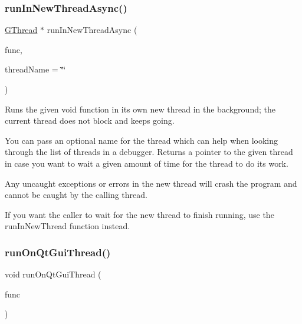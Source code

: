 \subsubsection{\texorpdfstring{run\+In\+New\+Thread\+Async()}{runInNewThreadAsync()}}
{\footnotesize\ttfamily \mbox{\hyperlink{classsgl_1_1GThread}{G\+Thread}} $\ast$ run\+In\+New\+Thread\+Async (\begin{DoxyParamCaption}\item[{\mbox{\hyperlink{namespacesgl_aa508400d1219d217e0e9509ff59a58f4}{G\+Thunk}}}]{func,  }\item[{const std\+::string \&}]{thread\+Name = {\ttfamily \char`\"{}\char`\"{}} }\end{DoxyParamCaption})\hspace{0.3cm}{\ttfamily [static]}}



Runs the given void function in its own new thread in the background; the current thread does not block and keeps going. 

You can pass an optional name for the thread which can help when looking through the list of threads in a debugger. Returns a pointer to the given thread in case you want to wait a given amount of time for the thread to do its work.

Any uncaught exceptions or errors in the new thread will crash the program and cannot be caught by the calling thread.

If you want the caller to wait for the new thread to finish running, use the {\ttfamily run\+In\+New\+Thread} function instead. \mbox{\label{classsgl_1_1GThread_a33da0c87717269710ac7a564a1ebbe64}} 
\subsubsection{\texorpdfstring{run\+On\+Qt\+Gui\+Thread()}{runOnQtGuiThread()}}
{\footnotesize\ttfamily void run\+On\+Qt\+Gui\+Thread (\begin{DoxyParamCaption}\item[{\mbox{\hyperlink{namespacesgl_aa508400d1219d217e0e9509ff59a58f4}{G\+Thunk}}}]{func }\end{DoxyParamCaption})\hspace{0.3cm}{\ttfamily [static]}}



